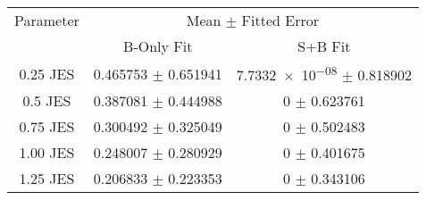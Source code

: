 \begin{scriptsize}
\begin{table}
\centering
\begin{tabular}{ccc}
\toprule
Parameter & \multicolumn{2}{c}{{Mean $\pm$ Fitted Error}}\\
 & {B-Only Fit} & {S+B Fit}\\
\midrule
\num[round-precision=2]{0.25} JES & \num{0.465753} $\pm$ \num{0.651941} & \num{7.7332e-08} $\pm$ \num{0.818902}\\
\num[round-precision=2]{0.5} JES & \num{0.387081} $\pm$ \num{0.444988} & \num{0} $\pm$ \num{0.623761}\\
\num[round-precision=2]{0.75} JES & \num{0.300492} $\pm$ \num{0.325049} & \num{0} $\pm$ \num{0.502483}\\
\num[round-precision=2]{1.00} JES & \num{0.248007} $\pm$ \num{0.280929} & \num{0} $\pm$ \num{0.401675}\\
\num[round-precision=2]{1.25} JES & \num{0.206833} $\pm$ \num{0.223353} & \num{0} $\pm$ \num{0.343106}\\
\bottomrule
\end{tabular}
\end{table}
\end{scriptsize}
